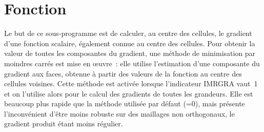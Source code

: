 %
% 
%
% 
% 
% 
%
%


\vspace{1cm}
\section{Fonction}
Le but de ce sous-programme est de calculer, au centre des cellules, le gradient
d'une fonction scalaire, \'egalement connue au centre des cellules. 
Pour obtenir la valeur de toutes les composantes du gradient, une m\'ethode de
minimisation par moindres carr\'es est mise en  
\oe uvre~: elle utilise l'estimation d'une composante du gradient aux faces, 
obtenue \`a partir des
valeurs de la fonction au centre des cellules voisines. Cette m\'ethode est 
activ\'ee lorsque l'indicateur IMRGRA vaut~1 et on l'utilise alors pour le calcul
des gradients de toutes les grandeurs. Elle est beaucoup plus rapide que la m\'ethode
utilis\'ee par d\'efaut (=0), mais pr\'esente l'inconv\'enient
d'\^etre moins robuste
sur des maillages non orthogonaux, le gradient produit \'etant moins r\'egulier.



